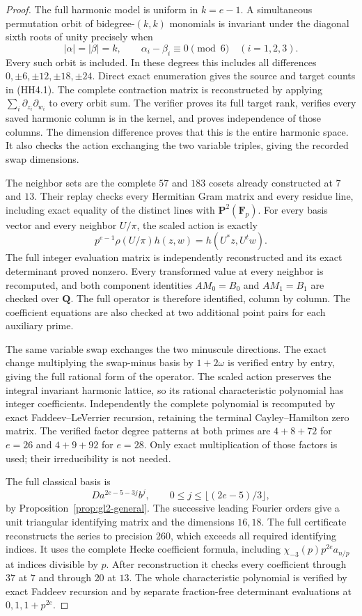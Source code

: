 \begin{proof}
The full harmonic model is uniform in \(k=e-1\).
A simultaneous permutation orbit of bidegree-\((k,k)\) monomials
is invariant under the diagonal sixth roots of unity precisely when
\[
 |\alpha|=|\beta|=k,\qquad
 \alpha_i-\beta_i\equiv0\pmod6\quad(i=1,2,3).
 \tag{HH4.4}
\]
Every such orbit is included. In these degrees this includes
all differences \(0,\pm6,\pm12,\pm18,\pm24\).
Direct exact enumeration gives the source and target counts in
(HH4.1). The complete contraction matrix is reconstructed by
applying \(\sum_i\partial_{z_i}\partial_{w_i}\) to every orbit sum.
The verifier proves its full target rank, verifies every saved
harmonic column is in the kernel, and proves independence of
those columns. The dimension difference proves that this is the
entire harmonic space. It also checks the action exchanging the
two variable triples, giving the recorded swap dimensions.

The neighbor sets are the complete \(57\) and \(183\) cosets
already constructed at \(7\) and \(13\). Their replay checks every
Hermitian Gram matrix and every residue line, including exact
equality of the distinct lines with \(\mathbf P^2(\mathbf F_p)\).
For every basis vector and every neighbor \(U/\pi\), the scaled
action is exactly
\[
 p^{e-1}\rho(U/\pi)h(z,w)=h(U^*z,U^tw).
 \tag{HH4.5}
\]
The full integer evaluation matrix is independently reconstructed
and its exact determinant proved nonzero. Every transformed value
at every neighbor is recomputed, and both component identities
\(AM_0=B_0\) and \(AM_1=B_1\) are checked over \(\mathbf Q\).
The full operator is therefore identified, column by column.
The coefficient equations are also checked at two additional
point pairs for each auxiliary prime.

The same variable swap exchanges the two minuscule directions.
The exact change multiplying the swap-minus basis by \(1+2\omega\)
is verified entry by entry, giving the full rational form of the
operator. The scaled action preserves the integral invariant
harmonic lattice, so its rational characteristic polynomial has
integer coefficients. Independently the complete polynomial is
recomputed by exact Faddeev--LeVerrier recursion, retaining the
terminal Cayley--Hamilton zero matrix. The verified factor degree
patterns at both primes are \(4+8+72\) for \(e=26\) and
\(4+9+92\) for \(e=28\). Only exact multiplication of those
factors is used; their irreducibility is not needed.

The full classical basis is
\[
 Da^{2e-5-3j}b^j,
 \qquad 0\le j\le\lfloor(2e-5)/3\rfloor,
 \tag{HH4.6}
\]
by Proposition~\ref{prop:gl2-general}. The successive leading
Fourier orders give a unit triangular identifying matrix and the
dimensions \(16,18\). The full certificate reconstructs the series
to precision \(260\), which exceeds all required identifying
indices. It uses the complete Hecke coefficient formula, including
\(\chi_{-3}(p)p^{2e}a_{n/p}\) at indices divisible by \(p\).
After reconstruction it checks every coefficient through \(37\)
at \(7\) and through \(20\) at \(13\). The whole characteristic
polynomial is verified by exact Faddeev recursion and by separate
fraction-free determinant evaluations at \(0,1,1+p^{2e}\).


\end{proof}
